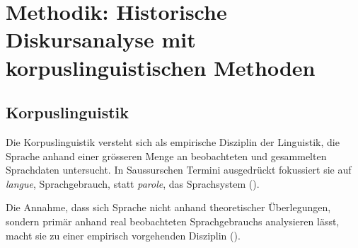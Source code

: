 

\chapter{Methodik: Historische Diskursanalyse mit korpuslinguistischen Methoden} %

\label{Chapter3} %


\section{Korpuslinguistik}

Die Korpuslinguistik versteht sich als empirische Disziplin der Linguistik, die Sprache anhand einer grösseren Menge an beobachteten und gesammelten Sprachdaten untersucht. In Saussurschen Termini ausgedrückt fokussiert sie auf \textit{langue}, Sprachgebrauch, statt \textit{parole}, das Sprachsystem (\cite[30-31]{lemnitzer_korpuslinguistik_2015}).

Die Annahme, dass sich Sprache nicht anhand theoretischer Überlegungen, sondern primär anhand real beobachteten Sprachgebrauchs analysieren lässt, macht sie zu einer empirisch vorgehenden Disziplin (\cite[21]{lemnitzer_korpuslinguistik_2015}). 

